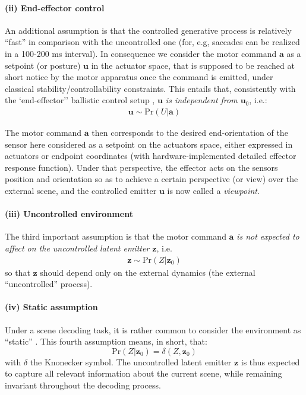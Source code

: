 \documentclass[12pt,twoside,openright]{article}
\begin{document}
\paragraph{(ii) End-effector control}
An additional assumption is that the controlled generative process is relatively ``fast'' in comparison with the uncontrolled one
(for, e.g, saccades can be realized in a 100-200 ms interval). 
In consequence we consider the motor command $\boldsymbol{a}$ as a setpoint (or posture) $\boldsymbol{u}$ in the actuator space, that is supposed to be reached 
at short notice by the motor apparatus once the command is emitted, under classical stability/controllability constraints.
This entails that, consistently with the `end-effector'' ballistic control setup \cite{mussa2004neural},  \emph{$\boldsymbol{u}$ is independent from $\boldsymbol{u}_0$},
i.e.:
\begin{align*}
\boldsymbol{u}\sim\text{Pr}(U|\boldsymbol{a})
\end{align*}

The motor command $\boldsymbol{a}$ then corresponds to the desired end-orientation of the sensor here considered as a setpoint on the actuators space, either expressed in actuators or endpoint coordinates (with hardware-implemented detailed effector response function).  
Under that perspective, the effector acts on the sensors position and orientation so as to achieve a certain perspective (or view) over the external scene, and the controlled emitter $\boldsymbol{u}$ is now called a \emph{viewpoint}. 

\paragraph{(iii) Uncontrolled environment}
The third important assumption is that the motor command $\boldsymbol{a}$ \emph{is not expected to affect on the uncontrolled latent emitter $\boldsymbol{z}$}, i.e.
\begin{align*}
\boldsymbol{z} \sim \text{Pr}(Z|\boldsymbol{z}_0)
\end{align*}
so that $\boldsymbol{z}$ should depend only on the external dynamics (the external ``uncontrolled'' process).

\paragraph{(iv) Static assumption}
Under a scene decoding  task, %
it is rather common to consider the environment as ``static'' \cite{butko2010infomax}. This fourth assumption means, in short, that:
$$\text{Pr}(Z|\boldsymbol{z}_0) = \delta(Z, \boldsymbol{z}_0)$$ 
with $\delta$ the Knonecker symbol. 
The uncontrolled latent emitter $\boldsymbol{z}$ is thus expected to capture all relevant information about the current scene, while remaining invariant throughout the decoding process.
\end{document}
